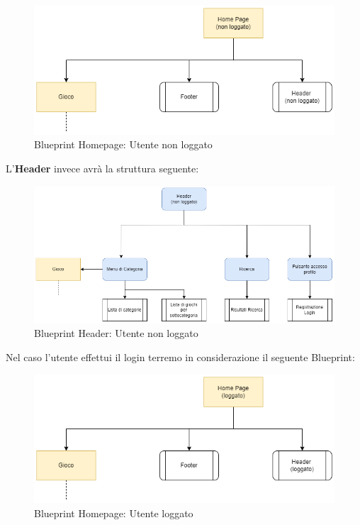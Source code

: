 \documentclass[../Report.tex]{subfiles}
\begin{document}
    \begin{figure}[H]
        \includegraphics[width=\linewidth]{BP_homepage non loggato.png}
        \centering
        \caption{Blueprint Homepage: Utente non loggato}
    \end{figure}

    L'\textbf{Header} invece avrà la struttura seguente:
    
    \begin{figure}[H]
        \includegraphics[width=\linewidth]{BP_HeaderNOLOG.png}
        \centering
        \caption{Blueprint Header: Utente non loggato}
    \end{figure}


    Nel caso l'utente effettui il login terremo in considerazione il seguente Blueprint:

    \begin{figure}[H]
        \includegraphics[width=\linewidth]{BP_homepage loggato.png}
        \centering
        \caption{Blueprint Homepage: Utente loggato}
    \end{figure}
\end{document}
